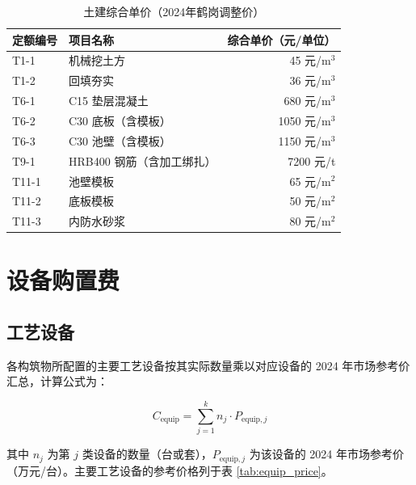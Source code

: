 \documentclass[12pt,a4paper]{ctexart}
\begin{document}
\begin{table}[htbp]
\centering
\caption{土建综合单价（2024年鹤岗调整价）}
\label{tab:civil_price}
\begin{tabular}{llr}
\toprule
\textbf{定额编号} & \textbf{项目名称} & \textbf{综合单价（元/单位）} \\
\midrule
T1-1  & 机械挖土方              & 45 元/m$^3$ \\
T1-2  & 回填夯实                & 36 元/m$^3$ \\
T6-1  & C15 垫层混凝土          & 680 元/m$^3$ \\
T6-2  & C30 底板（含模板）      & 1050 元/m$^3$ \\
T6-3  & C30 池壁（含模板）      & 1150 元/m$^3$ \\
T9-1  & HRB400 钢筋（含加工绑扎）& 7200 元/t \\
T11-1 & 池壁模板                & 65 元/m$^2$ \\
T11-2 & 底板模板                & 50 元/m$^2$ \\
T11-3 & 内防水砂浆              & 80 元/m$^2$ \\
\bottomrule
\end{tabular}
\end{table}

\section{设备购置费}

\subsection{工艺设备}

各构筑物所配置的主要工艺设备按其实际数量乘以对应设备的 2024 年市场参考价汇总，计算公式为：

\begin{equation}
C_{\text{equip}} = \sum_{j=1}^{k} n_j \cdot P_{\text{equip},j}
\end{equation}

其中 $n_j$ 为第 $j$ 类设备的数量（台或套），$P_{\text{equip},j}$ 为该设备的 2024 年市场参考价（万元/台）。主要工艺设备的参考价格列于表 \ref{tab:equip_price}。
\end{document}
